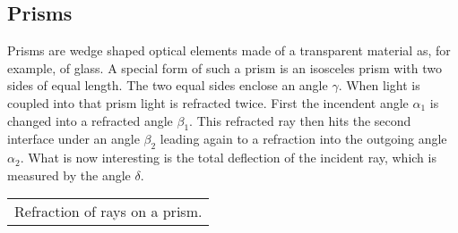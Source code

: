 \documentclass[letterpaper,10pt,english]{sphinxmanual}
\begin{document}
\subsection{Prisms}
\label{\detokenize{notebooks/L3/Optical Elements:Prisms}}
Prisms are wedge shaped optical elements made of a transparent material as, for example, of glass. A special form of such a prism is an isosceles prism with two sides of equal length. The two equal sides enclose an angle \(\gamma\). When light is coupled into that prism light is refracted twice. First the incendent angle \(\alpha_1\) is changed into a refracted angle \(\beta_1\). This refracted ray then hits the second interface under an angle \(\beta_2\) leading again to a
refraction into the outgoing angle \(\alpha_2\). What is now interesting is the total deflection of the incident ray, which is measured by the angle \(\delta\).




\begin{savenotes}\sphinxattablestart
\centering
\begin{tabulary}{\linewidth}[t]{|T|}
\hline
\sphinxstyletheadfamily 
{}
\\
\hline
{} Refraction of rays on a prism.
\\
\hline
\end{tabulary}
\par
\sphinxattableend\end{savenotes}
\end{document}
